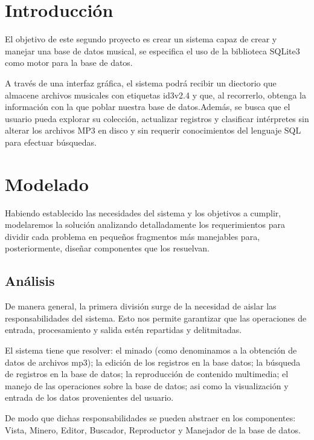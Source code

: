 \documentclass{rep}
\begin{document}
	
	\section{Introducción}

    El objetivo de este segundo proyecto es crear un sistema capaz de
    crear y manejar una base de datos musical, se especifica el uso
    de la biblioteca SQLite3 como motor para la base de datos.

    A través de una interfaz gráfica, el sistema podrá recibir un
    diectorio que almacene archivos musicales con etiquetas id3v2.4 y
    que, al recorrerlo, obtenga la información con la que poblar
    nuestra base de datos.Además, se busca que el usuario pueda
    explorar su colección, actualizar registros y clasificar
    intérpretes sin alterar los archivos MP3 en disco y sin requerir
    conocimientos del lenguaje SQL para efectuar búsquedas.
    
    \section{Modelado}

    Habiendo establecido las necesidades del sistema y los objetivos a
    cumplir, modelaremos la solución analizando detalladamente los
    requerimientos para dividir cada problema en pequeños fragmentos
    más manejables para, posteriormente, diseñar componentes que los
    resuelvan.

    \subsection{Análisis}

    De manera general, la primera división surge de la necesidad de
    aislar las responsabilidades del sistema. Esto nos permite
    garantizar que las operaciones de entrada, procesamiento y salida
    estén repartidas y delitmitadas. 
    
    El sistema tiene que resolver: el minado (como denominamos a la
    obtención de datos de archivos mp3); la edición de los registros
    en la base datos; la búsqueda de registros en la base de datos; la
    reproducción de contenido multimedia; el manejo de las operaciones
    sobre la base de datos; asi como la visualización y entrada de los
    datos provenientes del usuario.

    De modo que dichas responsabilidades se pueden abstraer en los
    componentes: Vista, Minero, Editor, Buscador, Reproductor y
    Manejador de la base de datos.
\end{document}
